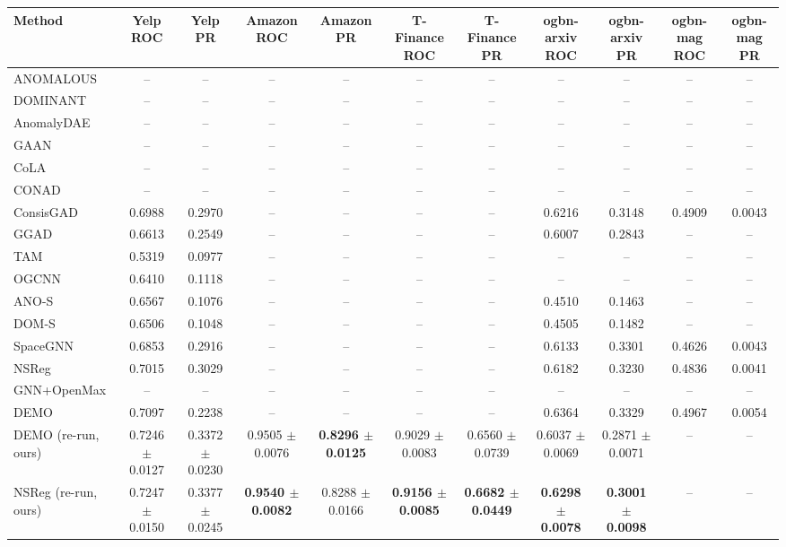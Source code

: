 \begin{table}[t]
\centering
\small
\begin{tabular}{lcccccccccc}
\toprule
Method & Yelp ROC & Yelp PR & Amazon ROC & Amazon PR & T-Finance ROC & T-Finance PR & ogbn-arxiv ROC & ogbn-arxiv PR & ogbn-mag ROC & ogbn-mag PR \\
\midrule
ANOMALOUS & -- & -- & -- & -- & -- & -- & -- & -- & -- & -- \\
DOMINANT & -- & -- & -- & -- & -- & -- & -- & -- & -- & -- \\
AnomalyDAE & -- & -- & -- & -- & -- & -- & -- & -- & -- & -- \\
GAAN & -- & -- & -- & -- & -- & -- & -- & -- & -- & -- \\
CoLA & -- & -- & -- & -- & -- & -- & -- & -- & -- & -- \\
CONAD & -- & -- & -- & -- & -- & -- & -- & -- & -- & -- \\
ConsisGAD & 0.6988 & 0.2970 & -- & -- & -- & -- & 0.6216 & 0.3148 & 0.4909 & 0.0043 \\
GGAD & 0.6613 & 0.2549 & -- & -- & -- & -- & 0.6007 & 0.2843 & -- & -- \\
TAM & 0.5319 & 0.0977 & -- & -- & -- & -- & -- & -- & -- & -- \\
OGCNN & 0.6410 & 0.1118 & -- & -- & -- & -- & -- & -- & -- & -- \\
ANO-S & 0.6567 & 0.1076 & -- & -- & -- & -- & 0.4510 & 0.1463 & -- & -- \\
DOM-S & 0.6506 & 0.1048 & -- & -- & -- & -- & 0.4505 & 0.1482 & -- & -- \\
SpaceGNN & 0.6853 & 0.2916 & -- & -- & -- & -- & 0.6133 & 0.3301 & 0.4626 & 0.0043 \\
NSReg & 0.7015 & 0.3029 & -- & -- & -- & -- & 0.6182 & 0.3230 & 0.4836 & 0.0041 \\
GNN+OpenMax & -- & -- & -- & -- & -- & -- & -- & -- & -- & -- \\
DEMO & 0.7097 & 0.2238 & -- & -- & -- & -- & 0.6364 & 0.3329 & 0.4967 & 0.0054 \\
DEMO (re-run, ours) & 0.7246 $\pm$ 0.0127 & 0.3372 $\pm$ 0.0230 & 0.9505 $\pm$ 0.0076 & \textbf{0.8296 $\pm$ 0.0125} & 0.9029 $\pm$ 0.0083 & 0.6560 $\pm$ 0.0739 & 0.6037 $\pm$ 0.0069 & 0.2871 $\pm$ 0.0071 & -- & -- \\
NSReg (re-run, ours) & 0.7247 $\pm$ 0.0150 & 0.3377 $\pm$ 0.0245 & \textbf{0.9540 $\pm$ 0.0082} & 0.8288 $\pm$ 0.0166 & \textbf{0.9156 $\pm$ 0.0085} & \textbf{0.6682 $\pm$ 0.0449} & \textbf{0.6298 $\pm$ 0.0078} & \textbf{0.3001 $\pm$ 0.0098} & -- & -- \\

\end{tabular}
\end{table}
